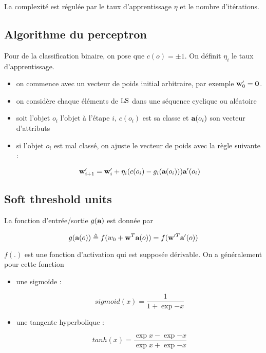 La complexité est régulée par le taux d'apprentissage $\eta$ et le nombre d'itérations.

	\subsection{Algorithme du perceptron}
	
	Pour de la classification binaire, on pose que $c(o) = \pm 1$. On définit $\eta_i$ le taux d'apprentissage.
	
	\begin{itemize}
		\item on commence avec un vecteur de poids initial arbitraire, par exemple $\textbf{w}_0' = \textbf{0}$.
		\item on considère chaque éléments de $\text{LS}$ dans une séquence cyclique ou aléatoire
		
		\item soit l'objet $o_i$ l'objet à l'étape $i$, $c(o_i)$ est sa classe et $\textbf{a}(o_i)$ son vecteur d'attributs
		\item si l'objet $o_i$ est mal classé, on ajuste le vecteur de poids avec la règle suivante :
		
		$$\textbf{w}_{i + 1}' = \textbf{w}_i' + \eta_i (c(o_i) - g_i(\textbf{a}(o_i))) \textbf{a}'(o_i)$$
	\end{itemize}
	
	
	\subsection{Soft threshold units}
	
	La fonction d'entrée/sortie $g(\textbf{a})$ est donnée par
	
	$$g(\textbf{a}(o)) \triangleq f(w_0 + \textbf{w}^T\textbf{a}(o)) = f(\textbf{w}'^T \textbf{a}'(o))$$
	
	$f(.)$ est une fonction d'activation qui est supposée dérivable. On a généralement pour cette fonction
	
	\begin{itemize}
		\item une sigmoïde :
		
		$$sigmoid(x) = \frac{1}{1 + \exp{-x}}$$
		
		\item une tangente hyperbolique :
		
		$$tanh(x) = \frac{\exp{x} - \exp{-x}}{\exp{x} + \exp{-x}}$$
	\end{itemize}
	
